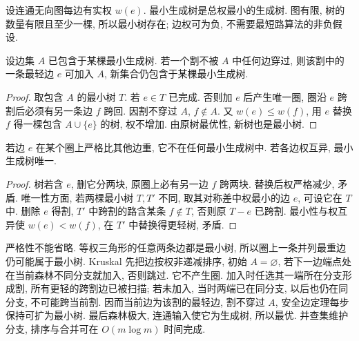 \label{ch:mst}
设连通无向图每边有实权 $w(e)$. 最小生成树是总权最小的生成树. 图有限, 树的数量有限且至少一棵, 所以最小树存在; 边权可为负, 不需要最短路算法的非负假设.
\begin{theorem}[安全边]\label{thm:safeedge}
设边集 $A$ 已包含于某棵最小生成树. 若一个割不被 $A$ 中任何边穿过, 则该割中的一条最轻边 $e$ 可加入 $A$, 新集合仍包含于某棵最小生成树.
\end{theorem}
\begin{proof}
取包含 $A$ 的最小树 $T$. 若 $e\in T$ 已完成. 否则加 $e$ 后产生唯一圈, 圈沿 $e$ 跨割后必须有另一条边 $f$ 跨回. 因割不穿过 $A$, $f\notin A$. 又 $w(e)\le w(f)$, 用 $e$ 替换 $f$ 得一棵包含 $A\cup\{e\}$ 的树, 权不增加. 由原树最优性, 新树也是最小树.
\end{proof}
\begin{proposition}[圈排除]
若边 $e$ 在某个圈上严格比其他边重, 它不在任何最小生成树中. 若各边权互异, 最小生成树唯一.
\end{proposition}
\begin{proof}
树若含 $e$, 删它分两块, 原圈上必有另一边 $f$ 跨两块. 替换后权严格减少, 矛盾. 唯一性方面, 若两棵最小树 $T,T'$ 不同, 取其对称差中权最小的边 $e$, 可设它在 $T$ 中. 删除 $e$ 得割, $T'$ 中跨割的路含某条 $f\notin T$, 否则原 $T-e$ 已跨割. 最小性与权互异使 $w(e)<w(f)$, 在 $T'$ 中替换得更轻树, 矛盾.
\end{proof}
严格性不能省略. 等权三角形的任意两条边都是最小树, 所以圈上一条并列最重边仍可能属于最小树.
Kruskal 先把边按权非递减排序, 初始 $A=\varnothing$, 若下一边端点处在当前森林不同分支就加入, 否则跳过. 它不产生圈. 加入时任选其一端所在分支形成割, 所有更轻的跨割边已被扫描; 若未加入, 当时两端已在同分支, 以后也仍在同分支, 不可能跨当前割. 因而当前边为该割的最轻边, 割不穿过 $A$, 安全边定理每步保持可扩为最小树. 最后森林极大, 连通输入使它为生成树, 所以最优. 并查集维护分支, 排序与合并可在 $O(m\log m)$ 时间完成.

